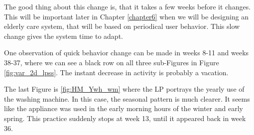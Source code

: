 The good thing about this change is, that it takes a few weeks before it changes. 
This will be important later in Chapter \ref{chapter6} when we will be designing an elderly care system, that will be based on periodical user behavior.
This slow change gives the system time to adapt. 

One observation of quick behavior change can be made in weeks 8-11 and weeks 38-37, where we can see a black row on all three sub-Figures in Figure \ref{fig:var_2d_lpss}.
The instant decrease in activity is probably a vacation.

The last Figure is \ref{fig:HM_Ywh_wm} where the LP portrays the yearly use of the washing machine.
In this case, the seasonal pattern is much clearer. 
It seems like the appliance was used in the early morning hours of the winter and early spring.
This practice suddenly stops at week 13, until it appeared back in week 36.
 
